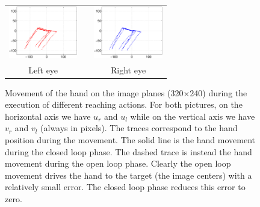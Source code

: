 \begin{figure}
  \begin{center}
	\begin{tabular}{ccc}
	  \parbox{30mm}{\includegraphics[width=30mm]{Figure/LeftEyeOpenClosedLoop.eps}}  & \hspace{.1cm} &
	  \parbox{30mm}{\includegraphics[width=30mm]{Figure/RightEyeOpenClosedLoop.eps}}
	  \\
	  \parbox{30mm}{\centering Left eye } & \hspace{.1cm} & \parbox{30mm}{\centering Right eye }
  \end{tabular}
\end{center}
\caption{Movement of the hand on the image planes (320$\times$240)
during the execution of different reaching actions. For both pictures, 
on the horizontal axis 
we have $u_r$ and $u_l$ while on the vertical axis we have $v_r$ and $v_l$ (always in pixels).
The traces correspond to the hand position during the movement. The solid line is the hand movement
during the closed loop phase. The dashed trace is instead the hand movement during the open loop 
phase. Clearly the open loop movement drives the hand to the target (the image centers) with a 
relatively small error. The closed loop phase reduces this error to zero.}\label{Fig:TimeResponseOpenClosedLoopErrors}
  \end{figure}
  
